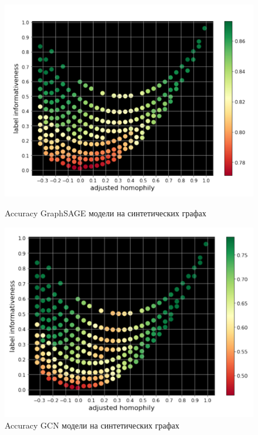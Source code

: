\documentclass[a4paper,14pt]{article}
\begin{document}
	\begin{figure}[!tbp]
		\centering
		\begin{minipage}[b]{0.4\textwidth}
			\includegraphics[width=\textwidth]{"images/Accuracy of GraphSAGE"}
			\caption{Accuracy GraphSAGE модели на синтетических графах}
			\label{fig:accuracy-of-graphsage}
		\end{minipage}
		\hfill
		\begin{minipage}[b]{0.4\textwidth}
			\includegraphics[width=\textwidth]{"images/Accuracy of GCN"}
			\caption{Accuracy GCN модели на синтетических графах}
			\label{fig:accuracy-of-gcn}
		\end{minipage}
	\end{figure}
\end{document}
